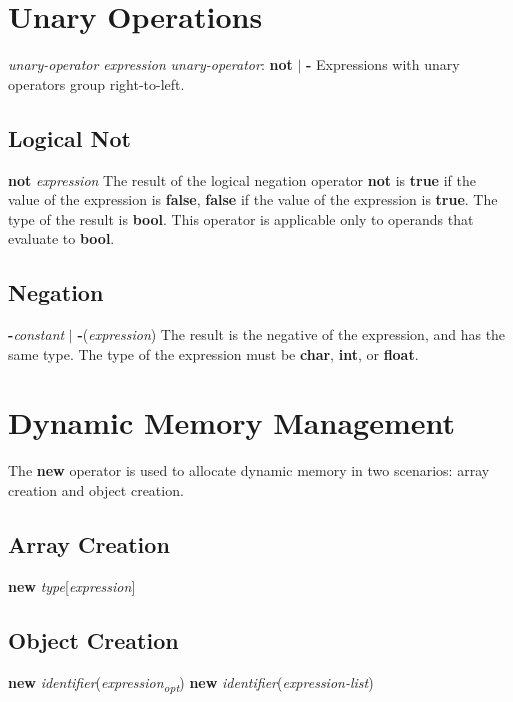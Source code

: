 \begin{homeworkProblem}
    \section{Unary Operations}
    \textit{unary-operator expression}
    \newline
    \textit{unary-operator}: \textbf{not} $|$ \textbf{-}
     \newline
     Expressions with unary operators group right-to-left.

    \subsection{Logical Not}
    \textbf{not} \textit{expression}
    \newline
    The result of the logical negation operator \textbf{not} is \textbf{true} if the value of the expression is \textbf{false}, \textbf{false} if the value of the expression is \textbf{true}. The type of the result is \textbf{bool}. This operator is applicable only to operands that evaluate to \textbf{bool}.

    \subsection{Negation}
    \textbf{-}\textit{constant} $|$ \textbf{-}(\textit{expression})
    \newline
    The result is the negative of the expression, and has the same type. The type of the expression must be \textbf{char}, \textbf{int}, or \textbf{float}.

    \section{Dynamic Memory Management}
    The \textbf{new} operator is used to allocate dynamic memory in two scenarios: array creation and object creation.
    \subsection{Array Creation}
    \textbf{new} \textit{type}[\textit{expression}]
    \subsection{Object Creation}
    \textbf{new} \textit{identifier}(\textit{expression\textsubscript{opt}})
    \newline
    \textbf{new} \textit{identifier}(\textit{expression-list})


\end{homeworkProblem}
